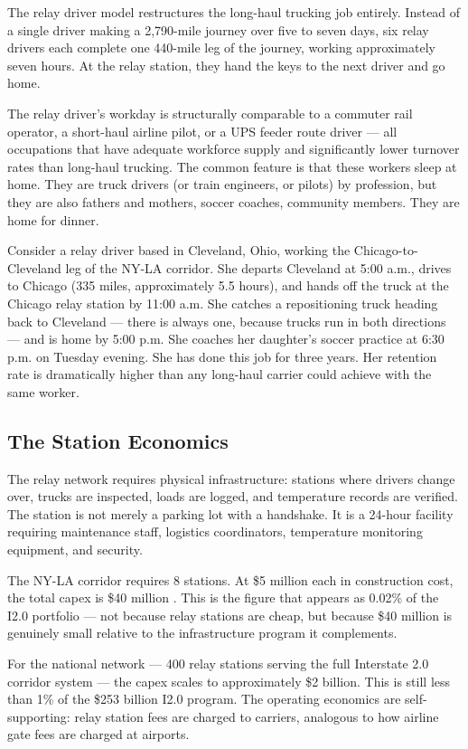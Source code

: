 The relay driver model restructures the long-haul trucking job entirely. Instead of a
single driver making a 2,790-mile journey over five to seven days, six relay drivers
each complete one 440-mile leg of the journey, working approximately seven hours.
At the relay station, they hand the keys to the next driver and go home.

The relay driver's workday is structurally comparable to a commuter rail operator, a
short-haul airline pilot, or a UPS feeder route driver --- all occupations that have
adequate workforce supply and significantly lower turnover rates than long-haul trucking.
The common feature is that these workers sleep at home. They are truck drivers
(or train engineers, or pilots) by profession, but they are also fathers and mothers,
soccer coaches, community members. They are home for dinner.

Consider a relay driver based in Cleveland, Ohio, working the Chicago-to-Cleveland leg
of the NY-LA corridor. She departs Cleveland at 5:00 a.m., drives to Chicago (335 miles,
approximately 5.5 hours), and hands off the truck at the Chicago relay station by 11:00 a.m.
She catches a repositioning truck heading back to Cleveland --- there is always one,
because trucks run in both directions --- and is home by 5:00 p.m. She coaches her
daughter's soccer practice at 6:30 p.m. on Tuesday evening. She has done this job for
three years. Her retention rate is dramatically higher than any long-haul carrier could
achieve with the same worker.

\subsection{The Station Economics}

The relay network requires physical infrastructure: stations where drivers change over,
trucks are inspected, loads are logged, and temperature records are verified. The station
is not merely a parking lot with a handshake. It is a 24-hour facility requiring maintenance
staff, logistics coordinators, temperature monitoring equipment, and security.

The NY-LA corridor requires 8 stations. At \$5 million each in construction cost,
the total capex is \$40 million \citep{ROUTE_C1}. This is the figure that appears as
0.02\% of the I2.0 portfolio --- not because relay stations are cheap, but because
\$40 million is genuinely small relative to the infrastructure program it complements.

For the national network --- 400 relay stations serving the full Interstate 2.0
corridor system --- the capex scales to approximately \$2 billion. This is still less
than 1\% of the \$253 billion I2.0 program. The operating economics are self-supporting:
relay station fees are charged to carriers, analogous to how airline gate fees are charged
at airports.

